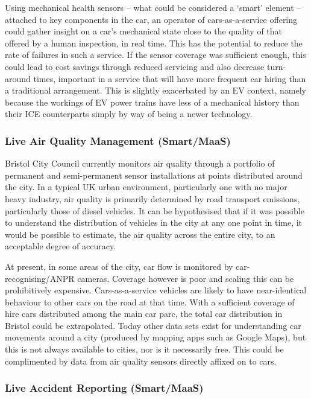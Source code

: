 \documentclass[journal]{IEEEtran}
\begin{document}
Using mechanical health sensors -- what could be considered a `smart'
element -- attached to key components in the car, an operator of
cars-as-a-service offering could gather insight on a car's mechanical
state close to the quality of that offered by a human inspection, in
real time. This has the potential to reduce the rate of failures in
such a service. If the sensor coverage was sufficient enough, this
could lead to cost savings through reduced servicing and also decrease
turn-around times, important in a service that will have more frequent
car hiring than a traditional arrangement. This is slightly
exacerbated by an EV context, namely because the workings of EV power
trains have less of a mechanical history than their ICE counterparts
simply by way of being a newer technology.

\subsubsection{Live Air Quality Management (Smart/MaaS)}

Bristol City Council currently monitors air quality through a
portfolio of permanent and semi-permanent sensor installations at
points distributed around the city. In a typical UK urban environment,
particularly one with no major heavy industry, air quality is
primarily determined by road transport emissions, particularly those
of diesel vehicles. It can be hypothesised that if it was possible to
understand the distribution of vehicles in the city at any one point
in time, it would be possible to estimate, the air quality across the
entire city, to an acceptable degree of accuracy.

At present, in some areas of the city, car flow is monitored by
car-recognising/ANPR cameras. Coverage however is poor and scaling
this can be prohibitively expensive. Cars-as-a-service vehicles are
likely to have near-identical behaviour to other cars on the road at
that time. With a sufficient coverage of hire cars distributed among
the main car parc, the total car distribution in Bristol could be
extrapolated. Today other data sets exist for understanding car
movements around a city (produced by mapping apps such as Google
Maps), but this is not always available to cities, nor is it
necessarily free. This could be complimented by data from air quality
sensors directly affixed on to cars.



\subsubsection{Live Accident Reporting (Smart/MaaS)}
\end{document}
